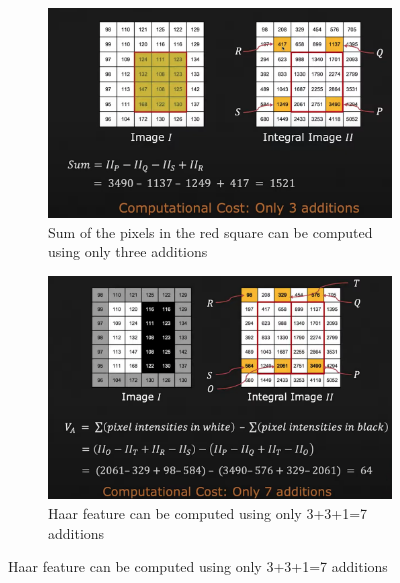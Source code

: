 \documentclass[12pt,a4paper]{article}
\begin{document}
\begin{large}
\begin{figure} [h!]
  \centering
    \begin{subfigure}[b]{0.4\textwidth}
    \centering
    \captionsetup{justification=centering}
      \includegraphics[width=\textwidth]{images/haar8.png}
      \caption{Sum of the pixels in the red square can be computed using only three additions}
      
    \end{subfigure}
    \hspace{0.1cm}
    \begin{subfigure}[b]{0.4\textwidth}
    \centering
    \captionsetup{justification=centering}
      \includegraphics[width=\textwidth]{images/haar9.png}
      \caption{Haar feature can be computed using only 3+3+1=7 additions}
      
    \end{subfigure}
  \end{figure}



\end{large}
\end{document}
